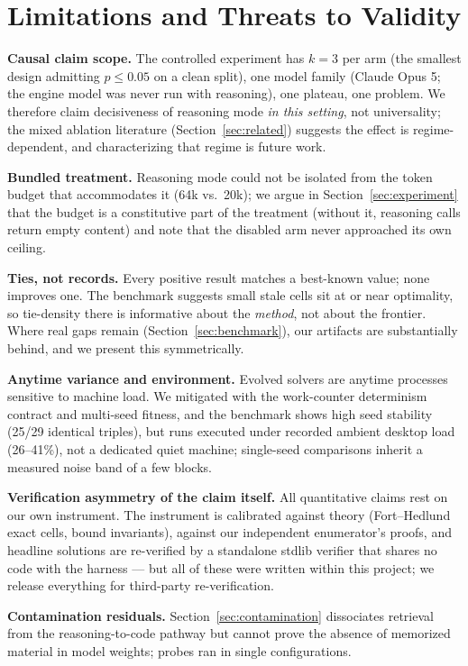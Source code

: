 \section{Limitations and Threats to Validity}\label{sec:limitations}

\textbf{Causal claim scope.} The controlled experiment has $k=3$ per
arm (the smallest design admitting $p \le 0.05$ on a clean split),
one model family (Claude Opus 5; the engine model was never run with
reasoning), one plateau, one problem. We therefore claim
decisiveness of reasoning mode \emph{in this setting}, not
universality; the mixed ablation literature
(Section~\ref{sec:related}) suggests the effect is regime-dependent,
and characterizing that regime is future work.

\textbf{Bundled treatment.} Reasoning mode could not be isolated from
the token budget that accommodates it (64k vs.\ 20k); we argue in
Section~\ref{sec:experiment} that the budget is a constitutive part
of the treatment (without it, reasoning calls return empty content)
and note that the disabled arm never approached its own ceiling.

\textbf{Ties, not records.} Every positive result matches a
best-known value; none improves one. The benchmark suggests small
stale cells sit at or near optimality, so tie-density there is
informative about the \emph{method}, not about the frontier. Where
real gaps remain (Section~\ref{sec:benchmark}), our artifacts are
substantially behind, and we present this symmetrically.

\textbf{Anytime variance and environment.} Evolved solvers are
anytime processes sensitive to machine load. We mitigated with the
work-counter determinism contract and multi-seed fitness, and the
benchmark shows high seed stability (25/29 identical triples), but
runs executed under recorded ambient desktop load (26--41\%), not a
dedicated quiet machine; single-seed comparisons inherit a measured
noise band of a few blocks.

\textbf{Verification asymmetry of the claim itself.} All quantitative
claims rest on our own instrument. The instrument is calibrated
against theory (Fort--Hedlund exact cells, bound invariants), against
our independent enumerator's proofs, and headline solutions are
re-verified by a standalone stdlib verifier that shares no code with
the harness --- but all of these were written within this project; we
release everything for third-party re-verification.

\textbf{Contamination residuals.} Section~\ref{sec:contamination}
dissociates retrieval from the reasoning-to-code pathway but cannot
prove the absence of memorized material in model weights; probes ran
in single configurations.

